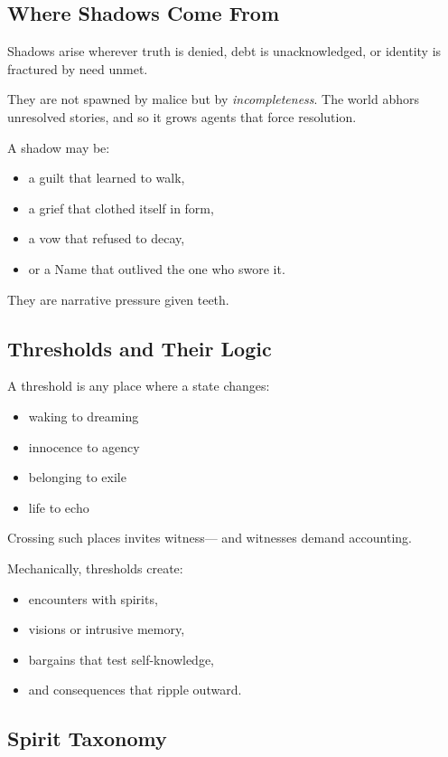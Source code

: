 \documentclass[11pt]{book}
\begin{document}
\subsection{Where Shadows Come From}

Shadows arise wherever truth is denied,  
debt is unacknowledged,  
or identity is fractured by need unmet.

They are not spawned by malice but by \emph{incompleteness}.  
The world abhors unresolved stories,  
and so it grows agents that force resolution.

\medskip

A shadow may be:
\begin{itemize}
    \item a guilt that learned to walk,
    \item a grief that clothed itself in form,
    \item a vow that refused to decay,
    \item or a Name that outlived the one who swore it.
\end{itemize}

They are narrative pressure given teeth.

\subsection{Thresholds and Their Logic}

A threshold is any place where a state changes:
\begin{itemize}
    \item waking to dreaming
    \item innocence to agency
    \item belonging to exile
    \item life to echo
\end{itemize}

Crossing such places invites witness---  
and witnesses demand accounting.

Mechanically, thresholds create:
\begin{itemize}
    \item encounters with spirits,
    \item visions or intrusive memory,
    \item bargains that test self-knowledge,
    \item and consequences that ripple outward.
\end{itemize}

\subsection{Spirit Taxonomy}
\end{document}
